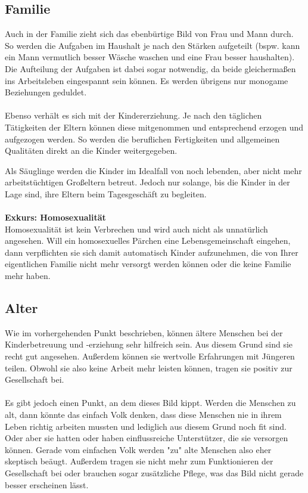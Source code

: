 \subsection{Familie}
Auch in der Familie zieht sich das ebenbürtige Bild von Frau und Mann durch. So werden die Aufgaben im Haushalt je nach den Stärken aufgeteilt (bspw. kann ein Mann vermutlich besser Wäsche waschen und eine Frau besser haushalten). Die Aufteilung der Aufgaben ist dabei sogar notwendig, da beide gleichermaßen ins Arbeitsleben eingespannt sein können. Es werden übrigens nur monogame Beziehungen geduldet.
\\
\\
Ebenso verhält es sich mit der Kindererziehung. Je nach den täglichen Tätigkeiten der Eltern können diese mitgenommen und entsprechend erzogen und aufgezogen werden. So werden die beruflichen Fertigkeiten und allgemeinen Qualitäten direkt an die Kinder weitergegeben.

Als Säuglinge werden die Kinder im Idealfall von noch lebenden, aber nicht mehr arbeitstüchtigen Großeltern betreut. Jedoch nur solange, bis die Kinder in der Lage sind, ihre Eltern beim Tagesgeschäft zu begleiten.
\\
\\
\textbf{Exkurs: Homosexualität}\\
Homosexualität ist kein Verbrechen und wird auch nicht als unnatürlich angesehen. Will ein homosexuelles Pärchen eine Lebensgemeinschaft eingehen, dann verpflichten sie sich damit automatisch Kinder aufzunehmen, die von Ihrer eigentlichen Familie nicht mehr versorgt werden können oder die keine Familie mehr haben.

\subsection{Alter}
Wie im vorhergehenden Punkt beschrieben, können ältere Menschen bei der Kinderbetreuung und -erziehung sehr hilfreich sein. Aus diesem Grund sind sie recht gut angesehen. Außerdem können sie wertvolle Erfahrungen mit Jüngeren teilen. Obwohl sie also keine Arbeit mehr leisten können, tragen sie positiv zur Gesellschaft bei.
\\
\\
Es gibt jedoch einen Punkt, an dem dieses Bild kippt. Werden die Menschen zu alt, dann könnte das einfach Volk denken, dass diese Menschen nie in ihrem Leben richtig arbeiten mussten und lediglich aus diesem Grund noch fit sind. Oder aber sie hatten oder haben einflussreiche Unterstützer, die sie versorgen können. Gerade vom einfachen Volk werden "zu" alte Menschen also eher skeptisch beäugt. Außerdem tragen sie nicht mehr zum Funktionieren der Gesellschaft bei oder brauchen sogar zusätzliche Pflege, was das Bild nicht gerade besser erscheinen lässt.

